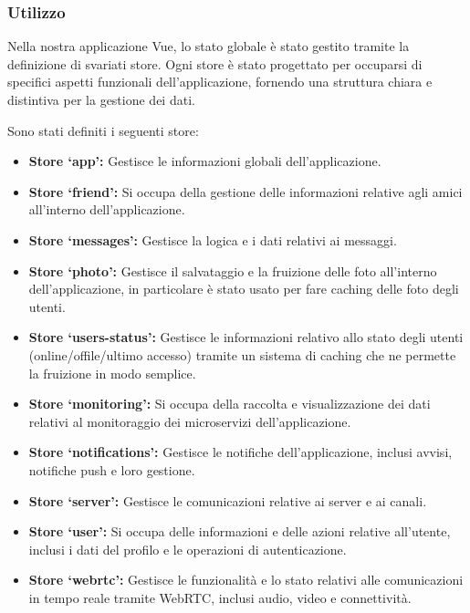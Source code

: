 %
%
%
\subsubsection{Utilizzo}

Nella nostra applicazione Vue, lo stato globale è stato gestito tramite la definizione di svariati store.
%
Ogni store è stato progettato per occuparsi di specifici aspetti funzionali dell'applicazione, fornendo una struttura chiara e distintiva per la gestione dei dati.

Sono stati definiti i seguenti store:

\begin{itemize}
    \item \textbf{Store `app':} Gestisce le informazioni globali dell'applicazione.
    
    \item \textbf{Store `friend':} Si occupa della gestione delle informazioni relative agli amici all'interno dell'applicazione.
    
    \item \textbf{Store `messages':} Gestisce la logica e i dati relativi ai messaggi.

    \item \textbf{Store `photo':} Gestisce il salvataggio e la fruizione delle foto all'interno dell'applicazione, in particolare è stato usato per fare caching delle foto degli utenti.

    \item \textbf{Store `users-status':} Gestisce le informazioni relativo allo stato degli utenti (online/offile/ultimo accesso) tramite un sistema di caching che ne permette la fruizione in modo semplice.
    
    \item \textbf{Store `monitoring':} Si occupa della raccolta e visualizzazione dei dati relativi al monitoraggio dei microservizi dell'applicazione.
    
    \item \textbf{Store `notifications':} Gestisce le notifiche dell'applicazione, inclusi avvisi, notifiche push e loro gestione.
    
    \item \textbf{Store `server':} Gestisce le comunicazioni relative ai server e ai canali.
    
    \item \textbf{Store `user':} Si occupa delle informazioni e delle azioni relative all'utente, inclusi i dati del profilo e le operazioni di autenticazione.
    
    \item \textbf{Store `webrtc':} Gestisce le funzionalità e lo stato relativi alle comunicazioni in tempo reale tramite WebRTC, inclusi audio, video e connettività.
\end{itemize}


